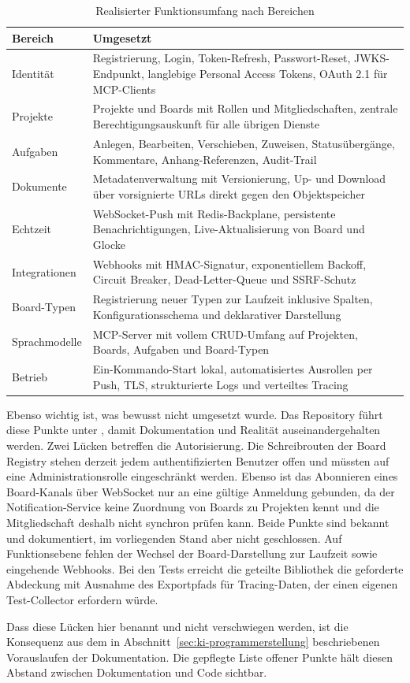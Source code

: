 \begin{table}[ht]
  \centering
  \caption{Realisierter Funktionsumfang nach Bereichen}
  \label{tab:funktionsumfang}
  \begin{tabularx}{\linewidth}{@{}lX@{}}
    \toprule
    \textbf{Bereich} & \textbf{Umgesetzt} \\
    \midrule
    Identität      & Registrierung, Login, Token-Refresh, Passwort-Reset, JWKS-Endpunkt, langlebige Personal Access Tokens, OAuth 2.1 für MCP-Clients \\
    Projekte       & Projekte und Boards mit Rollen und Mitgliedschaften, zentrale Berechtigungsauskunft für alle übrigen Dienste \\
    Aufgaben       & Anlegen, Bearbeiten, Verschieben, Zuweisen, Statusübergänge, Kommentare, Anhang-Referenzen, Audit-Trail \\
    Dokumente      & Metadatenverwaltung mit Versionierung, Up- und Download über vorsignierte URLs direkt gegen den Objektspeicher \\
    Echtzeit       & WebSocket-Push mit Redis-Backplane, persistente Benachrichtigungen, Live-Aktualisierung von Board und Glocke \\
    Integrationen  & Webhooks mit HMAC-Signatur, exponentiellem Backoff, Circuit Breaker, Dead-Letter-Queue und SSRF-Schutz \\
    Board-Typen    & Registrierung neuer Typen zur Laufzeit inklusive Spalten, Konfigurationsschema und deklarativer Darstellung \\
    Sprachmodelle  & MCP-Server mit vollem CRUD-Umfang auf Projekten, Boards, Aufgaben und Board-Typen \\
    Betrieb        & Ein-Kommando-Start lokal, automatisiertes Ausrollen per Push, TLS, strukturierte Logs und verteiltes Tracing \\
    \bottomrule
  \end{tabularx}
\end{table}

Ebenso wichtig ist, was bewusst nicht umgesetzt wurde. Das Repository führt diese Punkte unter , damit Dokumentation und Realität auseinandergehalten werden. Zwei Lücken betreffen die Autorisierung. Die Schreibrouten der Board Registry stehen derzeit jedem authentifizierten Benutzer offen und müssten auf eine Administrationsrolle eingeschränkt werden. Ebenso ist das Abonnieren eines Board-Kanals über WebSocket nur an eine gültige Anmeldung gebunden, da der Notification-Service keine Zuordnung von Boards zu Projekten kennt und die Mitgliedschaft deshalb nicht synchron prüfen kann. Beide Punkte sind bekannt und dokumentiert, im vorliegenden Stand aber nicht geschlossen. Auf Funktionsebene fehlen der Wechsel der Board-Darstellung zur Laufzeit sowie eingehende Webhooks. Bei den Tests erreicht die geteilte Bibliothek die geforderte Abdeckung mit Ausnahme des Exportpfads für Tracing-Daten, der einen eigenen Test-Collector erfordern würde.

Dass diese Lücken hier benannt und nicht verschwiegen werden, ist die Konsequenz aus dem in Abschnitt~\vref{sec:ki-programmerstellung} beschriebenen Vorauslaufen der Dokumentation. Die gepflegte Liste offener Punkte hält diesen Abstand zwischen Dokumentation und Code sichtbar.
